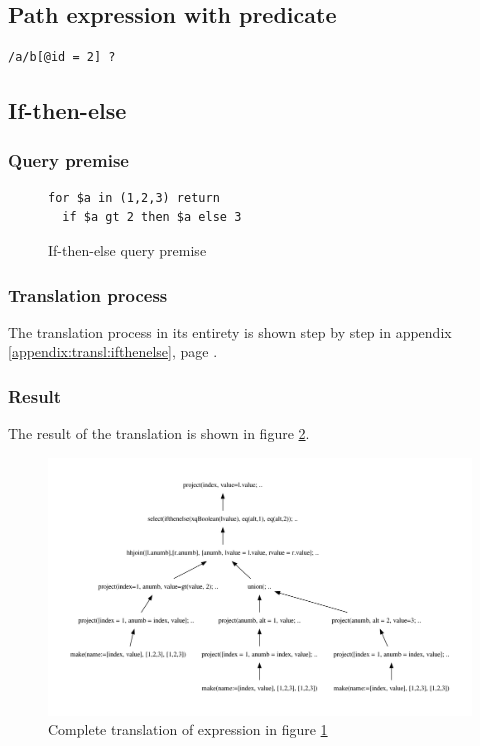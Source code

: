 \subsection{Path expression with predicate}
\begin{Verbatim}
/a/b[@id = 2] ?
\end{Verbatim}

\subsection{If-then-else}
\subsubsection{Query premise}
\begin{figure}[!htp]
\begin{center}
\begin{Verbatim}
for $a in (1,2,3) return
  if $a gt 2 then $a else 3
\end{Verbatim}
  \caption{If-then-else query premise}
  \label{fig:results:query_ifthenelse}
\end{center}
\end{figure}

\subsubsection{Translation process}
The translation process in its entirety is shown step by step in appendix
\ref{appendix:transl:ifthenelse}, page \pageref{appendix:transl:ifthenelse}.

\subsubsection{Result}
The result of the translation is shown in figure
\ref{fig:results:query_ifthenelse_result}.

\begin{figure}[!htp]
\begin{center}
  \includegraphics[width=1.0\textwidth]{img/graphs/ifthenelse}
  \caption{Complete translation of expression in figure
  \ref{fig:results:query_ifthenelse}}
  \label{fig:results:query_ifthenelse_result}
\end{center}
\end{figure}

